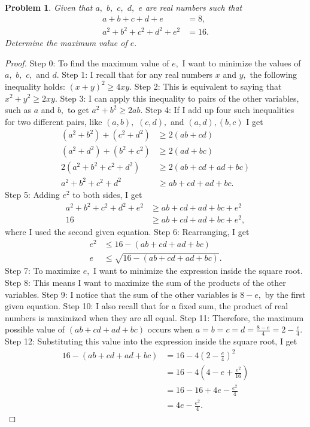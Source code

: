 \documentclass{article}
\newtheorem{theorem}{Problem}
\begin{document}
\begin{theorem}
Given that $a,$ $b,$ $c,$ $d,$ $e$ are real numbers such that \begin{align*}a + b + c + d + e &= 8, \\ a^2 + b^2 + c^2 + d^2 + e^2 &= 16.\end{align*} Determine the maximum value of $e.$
\end{theorem}

\begin{proof}
Step 0: To find the maximum value of $e,$ I want to minimize the values of $a,$ $b,$ $c,$ and $d.$
Step 1: I recall that for any real numbers $x$ and $y,$ the following inequality holds: $(x + y)^2 \geq 4xy.$
Step 2: This is equivalent to saying that $x^2 + y^2 \geq 2xy.$
Step 3: I can apply this inequality to pairs of the other variables, such as $a$ and $b,$ to get $a^2 + b^2 \geq 2ab.$
Step 4: If I add up four such inequalities for two different pairs, like $(a,b),$ $(c,d),$ and $(a,d), (b,c)$  I get\begin{align*}(a^2 + b^2) + (c^2 + d^2) &\geq 2(ab + cd) \\ (a^2 + d^2) + (b^2 + c^2) &\geq 2(ad + bc) \\ 2(a^2 + b^2 + c^2 + d^2) &\geq 2(ab + cd + ad + bc) \\ a^2 + b^2 + c^2 + d^2 &\geq ab + cd + ad + bc.\end{align*}
Step 5: Adding $e^2$ to both sides, I get \begin{align*}a^2 + b^2 + c^2 + d^2 + e^2 &\geq ab + cd + ad + bc + e^2 \\ 16 &\geq ab + cd + ad + bc + e^2,\end{align*} where I used the second given equation.
Step 6: Rearranging, I get \begin{align*}e^2 &\leq 16 - (ab + cd + ad + bc) \\ e &\leq \sqrt{16 - (ab + cd + ad + bc)}.\end{align*}
Step 7: To maximize $e,$ I want to minimize the expression inside the square root.
Step 8: This means I want to maximize the sum of the products of the other variables.
Step 9: I notice that the sum of the other variables is $8 - e,$ by the first given equation.
Step 10: I also recall that for a fixed sum, the product of real numbers is maximized when they are all equal.
Step 11: Therefore, the maximum possible value of $(ab + cd + ad + bc)$ occurs when $a = b = c = d = \frac{8 - e}{4} = 2 - \frac{e}{4}.$
Step 12: Substituting this value into the expression inside the square root, I get \begin{align*}16 - (ab + cd + ad + bc) &= 16 - 4\left(2 - \frac{e}{4}\right)^2 \\ &= 16 - 4\left(4 - e + \frac{e^2}{16}\right) \\ &= 16 - 16 + 4e - \frac{e^2}{4} \\ &= 4e - \frac{e^2}{4}.\end{align*}

\end{proof}
\end{document}
